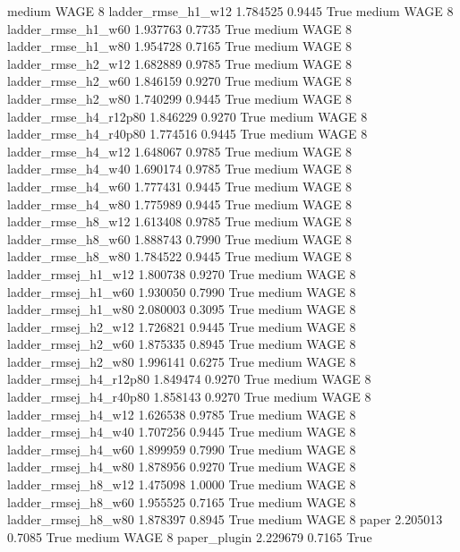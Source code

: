     medium     WAGE                 8     ladder_rmse_h1_w12   1.784525      0.9445    True
    medium     WAGE                 8     ladder_rmse_h1_w60   1.937763      0.7735    True
    medium     WAGE                 8     ladder_rmse_h1_w80   1.954728      0.7165    True
    medium     WAGE                 8     ladder_rmse_h2_w12   1.682889      0.9785    True
    medium     WAGE                 8     ladder_rmse_h2_w60   1.846159      0.9270    True
    medium     WAGE                 8     ladder_rmse_h2_w80   1.740299      0.9445    True
    medium     WAGE                 8  ladder_rmse_h4_r12p80   1.846229      0.9270    True
    medium     WAGE                 8  ladder_rmse_h4_r40p80   1.774516      0.9445    True
    medium     WAGE                 8     ladder_rmse_h4_w12   1.648067      0.9785    True
    medium     WAGE                 8     ladder_rmse_h4_w40   1.690174      0.9785    True
    medium     WAGE                 8     ladder_rmse_h4_w60   1.777431      0.9445    True
    medium     WAGE                 8     ladder_rmse_h4_w80   1.775989      0.9445    True
    medium     WAGE                 8     ladder_rmse_h8_w12   1.613408      0.9785    True
    medium     WAGE                 8     ladder_rmse_h8_w60   1.888743      0.7990    True
    medium     WAGE                 8     ladder_rmse_h8_w80   1.784522      0.9445    True
    medium     WAGE                 8    ladder_rmsej_h1_w12   1.800738      0.9270    True
    medium     WAGE                 8    ladder_rmsej_h1_w60   1.930050      0.7990    True
    medium     WAGE                 8    ladder_rmsej_h1_w80   2.080003      0.3095    True
    medium     WAGE                 8    ladder_rmsej_h2_w12   1.726821      0.9445    True
    medium     WAGE                 8    ladder_rmsej_h2_w60   1.875335      0.8945    True
    medium     WAGE                 8    ladder_rmsej_h2_w80   1.996141      0.6275    True
    medium     WAGE                 8 ladder_rmsej_h4_r12p80   1.849474      0.9270    True
    medium     WAGE                 8 ladder_rmsej_h4_r40p80   1.858143      0.9270    True
    medium     WAGE                 8    ladder_rmsej_h4_w12   1.626538      0.9785    True
    medium     WAGE                 8    ladder_rmsej_h4_w40   1.707256      0.9445    True
    medium     WAGE                 8    ladder_rmsej_h4_w60   1.899959      0.7990    True
    medium     WAGE                 8    ladder_rmsej_h4_w80   1.878956      0.9270    True
    medium     WAGE                 8    ladder_rmsej_h8_w12   1.475098      1.0000    True
    medium     WAGE                 8    ladder_rmsej_h8_w60   1.955525      0.7165    True
    medium     WAGE                 8    ladder_rmsej_h8_w80   1.878397      0.8945    True
    medium     WAGE                 8                  paper   2.205013      0.7085    True
    medium     WAGE                 8           paper_plugin   2.229679      0.7165    True